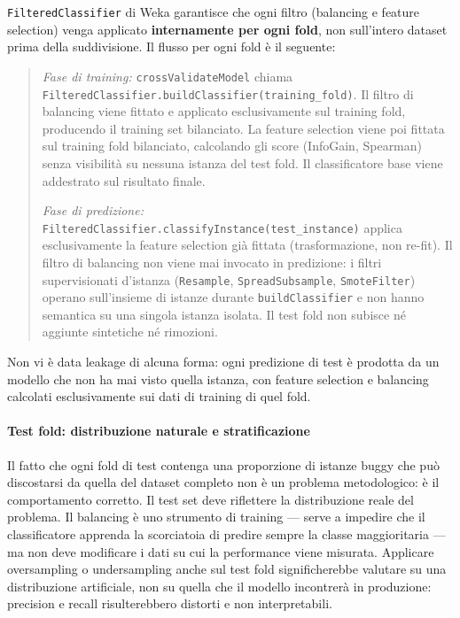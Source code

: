 \texttt{FilteredClassifier} di Weka garantisce che ogni filtro (balancing e feature
selection) venga applicato \textbf{internamente per ogni fold}, non sull'intero dataset
prima della suddivisione. Il flusso per ogni fold è il seguente:

\begin{quote}
\textit{Fase di training:} \texttt{crossValidateModel} chiama
\texttt{FilteredClassifier.buildClassifier(training\_fold)}. Il filtro di balancing
viene fittato e applicato esclusivamente sul training fold, producendo il training
set bilanciato. La feature selection viene poi fittata sul training fold bilanciato,
calcolando gli score (InfoGain, Spearman) senza visibilità su nessuna istanza del
test fold. Il classificatore base viene addestrato sul risultato finale.
\smallskip

\textit{Fase di predizione:} \texttt{FilteredClassifier.classifyInstance(test\_instance)}
applica esclusivamente la feature selection già fittata (trasformazione, non re-fit).
Il filtro di balancing non viene mai invocato in predizione: i filtri supervisionati
d'istanza (\texttt{Resample}, \texttt{SpreadSubsample}, \texttt{SmoteFilter}) operano
sull'insieme di istanze durante \texttt{buildClassifier} e non hanno semantica su una
singola istanza isolata. Il test fold non subisce né aggiunte sintetiche né rimozioni.
\end{quote}

Non vi è data leakage di alcuna forma: ogni predizione di test è prodotta da un
modello che non ha mai visto quella istanza, con feature selection e balancing calcolati
esclusivamente sui dati di training di quel fold.

\paragraph{Test fold: distribuzione naturale e stratificazione}

Il fatto che ogni fold di test contenga una proporzione di istanze buggy che può
discostarsi da quella del dataset completo non è un problema metodologico: è il
comportamento corretto. Il test set deve riflettere la distribuzione reale del problema.
Il balancing è uno strumento di training --- serve a impedire che il classificatore
apprenda la scorciatoia di predire sempre la classe maggioritaria --- ma non deve
modificare i dati su cui la performance viene misurata. Applicare oversampling o
undersampling anche sul test fold significherebbe valutare su una distribuzione
artificiale, non su quella che il modello incontrerà in produzione: precision e recall
risulterebbero distorti e non interpretabili.

